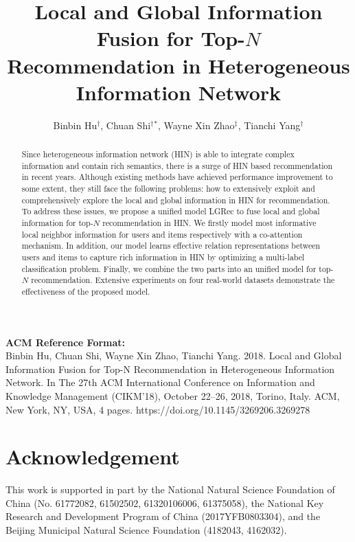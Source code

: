 \documentclass[sigconf]{acmart}
\author{
Binbin Hu$^\dag$,
Chuan Shi$^\dag$$^*$,
Wayne Xin Zhao$^\ddag$,
Tianchi Yang$^\dag$
}\thanks{*Corresponding Author}
\affiliation{
\institution{$^\dag$ Beijing University of Posts and Telecommunications, Beijing, China}
\institution{$^\ddag$ School of Information, Renmin University of China, Beijing, China}
}
\begin{document}
\title{Local and Global Information Fusion for Top-$N$  \\ Recommendation in Heterogeneous Information Network}


\begin{abstract}
Since heterogeneous information network (HIN) is able to integrate complex information and contain rich semantics, there is a surge of HIN based recommendation in recent years. 
Although existing methods have achieved performance improvement to some extent, they still face the following problems: how to extensively exploit and comprehensively explore the local and global information in HIN for recommendation. To address these issues, we propose a unified model LGRec to fuse local and global information for top-$N$ recommendation in HIN. 
We firstly model most informative local neighbor information for users and items respectively with a co-attention mechanism. In addition, our model learns effective relation representations between users and items to capture rich information in HIN by optimizing a multi-label classification problem.
Finally, we combine the two parts into an unified model for top-$N$ recommendation. 
Extensive experiments on four real-world datasets demonstrate the effectiveness of the proposed model.
\end{abstract}




\maketitle

{\textbf{ACM Reference Format:}\\
Binbin Hu, Chuan Shi, Wayne Xin Zhao, Tianchi Yang. 2018. Local
and Global Information Fusion for Top-N Recommendation in Heterogeneous
Information Network. In The 27th ACM International Conference on
Information and Knowledge Management (CIKM'18), October 22--26, 2018,
Torino, Italy. ACM, New York, NY, USA, 4 pages. 
https://doi.org/10.1145/3269206.3269278 
} 







\section{Acknowledgement}
This work is supported in part by the National Natural Science Foundation of China (No. 61772082, 61502502, 61320106006, 61375058), the National Key Research and Development Program of China (2017YFB0803304), and the Beijing Municipal Natural Science Foundation (4182043, 4162032). 



\end{document}
